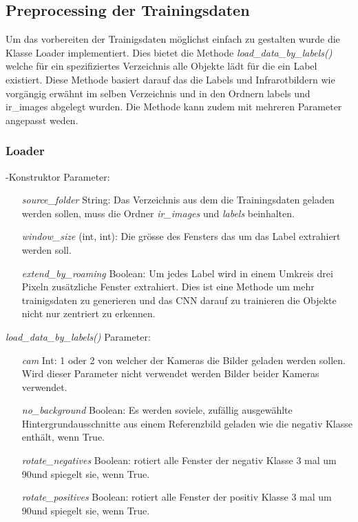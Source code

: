 \subsection{Preprocessing der Trainingsdaten}

Um das vorbereiten der Trainigsdaten möglichst einfach zu gestalten wurde die Klasse Loader implementiert. Dies bietet die Methode \textit{load\_data\_by\_labels()} welche für ein spezifiziertes Verzeichnis alle Objekte lädt für die ein Label existiert. Diese Methode basiert darauf das die Labels und Infrarotbildern wie vorgängig erwähnt im selben Verzeichnis und in den Ordnern labels und ir\_images abgelegt wurden. Die Methode kann zudem mit mehreren Parameter angepasst weden.

\subsubsection{Loader}

\noindent -Konstruktor Parameter:
\begin{itemize}[leftmargin=*, labelindent=3cm, labelsep=1cm]
	\item[\textit{source\_folder}] String: Das Verzeichnis aus dem die Trainingsdaten geladen werden sollen, muss die Ordner \textit{ir\_images} und \textit{labels} beinhalten.
	\item[\textit{window\_size}] (int, int): Die grösse des Fensters das um das Label extrahiert werden soll.
	\item[\textit{extend\_by\_roaming}] Boolean: Um jedes Label wird in einem Umkreis drei Pixeln zusätzliche Fenster extrahiert. Dies ist eine Methode um mehr trainigsdaten zu generieren und das CNN darauf zu trainieren die Objekte nicht nur zentriert zu erkennen.
\end{itemize}
\vspace{2em}
\noindent\textit{load\_data\_by\_labels()} Parameter:
\begin{itemize}[leftmargin=*,labelindent=3cm, labelsep=1cm]
		\item[\textit{cam}] Int: 1 oder 2 von welcher der Kameras die Bilder geladen werden sollen. Wird dieser Parameter nicht verwendet werden Bilder beider Kameras verwendet.
		\item[\textit{no\_background}] Boolean: Es werden soviele, zufällig ausgewählte Hintergrundausschnitte aus einem Referenzbild geladen wie die negativ Klasse enthält, wenn True.
		\item[\textit{rotate\_negatives}] Boolean: rotiert alle Fenster der negativ Klasse 3 mal um 90\degree und spiegelt sie, wenn True.
		\item[\textit{rotate\_positives}] Boolean: rotiert alle Fenster der positiv Klasse 3 mal um 90\degree und spiegelt sie, wenn True.
\end{itemize}

